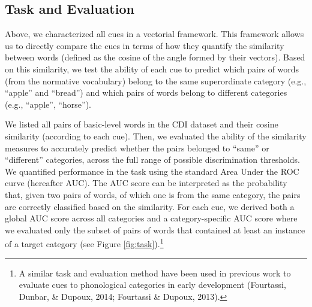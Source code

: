 \documentclass[english,,man,floatsintext]{apa6}
\let\rmarkdownfootnote\footnote%
\def\footnote{\protect\rmarkdownfootnote}
\begin{document}
\hypertarget{task-and-evaluation}{%
\subsection{Task and Evaluation}\label{task-and-evaluation}}

Above, we characterized all cues in a vectorial framework. This
framework allows us to directly compare the cues in terms of how they
quantify the similarity between words (defined as the cosine of the
angle formed by their vectors). Based on this similarity, we test the
ability of each cue to predict which pairs of words (from the normative vocabulary) belong to the same superordinate category (e.g., \enquote{apple} and \enquote{bread}) and which pairs
of words belong to different categories (e.g., \enquote{apple}, \enquote{horse}).

We listed all pairs of basic-level words in the CDI dataset and their cosine similarity (according to each cue). Then, we evaluated the ability of the similarity measures to accurately predict whether the pairs belonged to \enquote{same} or \enquote{different}
categories, across the full range of possible discrimination thresholds.
We quantified performance in the task using the standard Area Under the ROC curve (hereafter AUC). The AUC score can be interpreted as the probability that, given two pairs of words, of which one is from the same category, the pairs are correctly classified based on the similarity. For each cue, we derived both a global AUC score across all
categories and a category-specific AUC score where we evaluated only the
subset of pairs of words that contained at least an instance of a target
category (see Figure \ref{fig:task}).\footnote{A similar task and evaluation method have been used in previous work to evaluate cues to phonological categories in early development (Fourtassi, Dunbar, \& Dupoux, 2014; Fourtassi \& Dupoux, 2013).}
\end{document}
